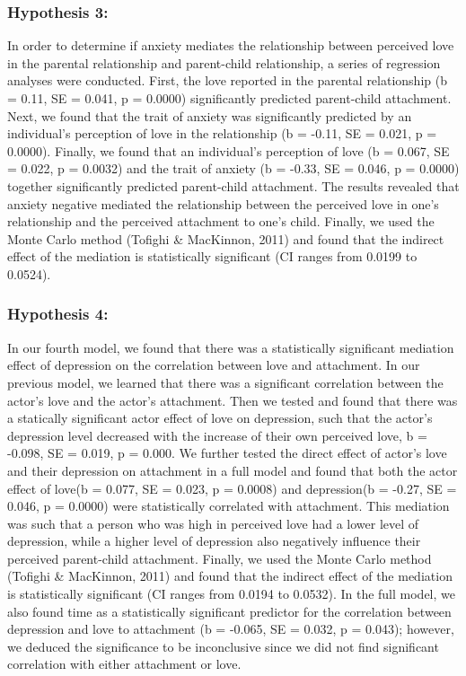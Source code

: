 \documentclass[man]{apa6}
\begin{document}
\hypertarget{hypothesis-3}{%
\subsubsection{Hypothesis 3:}\label{hypothesis-3}}

In order to determine if anxiety mediates the relationship between perceived love in the parental relationship and parent-child relationship, a series of regression analyses were conducted. First, the love reported in the parental relationship (b = 0.11, SE = 0.041, p = 0.0000) significantly predicted parent-child attachment. Next, we found that the trait of anxiety was significantly predicted by an individual's perception of love in the relationship (b = -0.11, SE = 0.021, p = 0.0000). Finally, we found that an individual's perception of love (b = 0.067, SE = 0.022, p = 0.0032) and the trait of anxiety (b = -0.33, SE = 0.046, p = 0.0000) together significantly predicted parent-child attachment. The results revealed that anxiety negative mediated the relationship between the perceived love in one's relationship and the perceived attachment to one's child. Finally, we used the Monte Carlo method (Tofighi \& MacKinnon, 2011) and found that the indirect effect of the mediation is statistically significant (CI ranges from 0.0199 to 0.0524).

\hypertarget{hypothesis-4}{%
\subsubsection{Hypothesis 4:}\label{hypothesis-4}}

In our fourth model, we found that there was a statistically significant mediation effect of depression on the correlation between love and attachment. In our previous model, we learned that there was a significant correlation between the actor's love and the actor's attachment. Then we tested and found that there was a statically significant actor effect of love on depression, such that the actor's depression level decreased with the increase of their own perceived love, b = -0.098, SE = 0.019, p = 0.000. We further tested the direct effect of actor's love and their depression on attachment in a full model and found that both the actor effect of love(b = 0.077, SE = 0.023, p = 0.0008) and depression(b = -0.27, SE = 0.046, p = 0.0000) were statistically correlated with attachment. This mediation was such that a person who was high in perceived love had a lower level of depression, while a higher level of depression also negatively influence their perceived parent-child attachment. Finally, we used the Monte Carlo method (Tofighi \& MacKinnon, 2011) and found that the indirect effect of the mediation is statistically significant (CI ranges from 0.0194 to 0.0532).
In the full model, we also found time as a statistically significant predictor for the correlation between depression and love to attachment (b = -0.065, SE = 0.032, p = 0.043); however, we deduced the significance to be inconclusive since we did not find significant correlation with either attachment or love.
\end{document}
